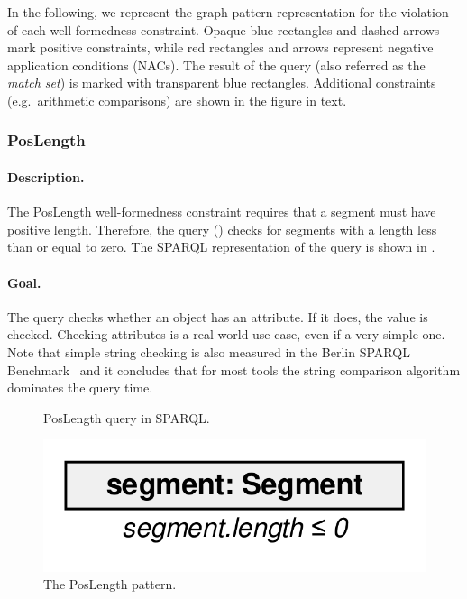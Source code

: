 In the following, we represent the graph pattern representation for the violation of each well-formedness constraint. Opaque blue rectangles and dashed arrows mark positive constraints, while red rectangles and arrows represent negative application conditions (NACs). The result of the query (also referred as the \emph{match set}) is marked with transparent blue rectangles. Additional constraints (e.g.\ arithmetic comparisons) are shown in the figure in text.


\subsubsection{PosLength}

\paragraph{Description.} The \textsf{PosLength} well-formedness constraint requires that a segment must have positive length. Therefore, the query () checks for segments with a length less than or equal to zero. The SPARQL representation of the query is shown in .

\paragraph{Goal.} The query checks whether an object has an attribute. If it does, the value is checked. Checking attributes is a real world use case, even if a very simple one. Note that simple string checking is also measured in the Berlin SPARQL Benchmark~\cite{BSBM} and it concludes that for most tools the string comparison algorithm dominates the query time.

\begin{figure}[htb]
\centering
\begin{minipage}{0.5\textwidth}
  { \alignListing
    }
  \caption{\textsf{PosLength} query in SPARQL.}
  \label{lst:poslength-sparql}
\end{minipage}
\end{figure}

\begin{figure}[htb]
		\centering
		\includegraphics[scale=0.4]{figures/pattern-poslength}
		\caption{The \textsf{PosLength} pattern.}
		\label{fig:pattern-poslength}
\end{figure}


